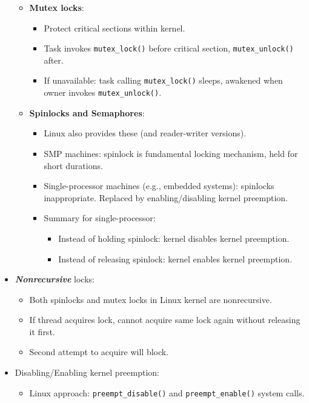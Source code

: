 \begin{itemize}
\begin{itemize}
        \item \textbf{Mutex locks}:
        \begin{itemize}
            \item Protect critical sections within kernel.
            \item Task invokes \texttt{mutex\_lock()} before critical section, \texttt{mutex\_unlock()} after.
            \item If unavailable: task calling \texttt{mutex\_lock()} sleeps, awakened when owner invokes \texttt{mutex\_unlock()}.
        \end{itemize}
        \item \textbf{Spinlocks and Semaphores}:
        \begin{itemize}
            \item Linux also provides these (and reader-writer versions).
            \item SMP machines: spinlock is fundamental locking mechanism, held for short durations.
            \item Single-processor machines (e.g., embedded systems): spinlocks inappropriate. Replaced by enabling/disabling kernel preemption.
            \item Summary for single-processor:
            \begin{itemize}
                \item Instead of holding spinlock: kernel disables kernel preemption.
                \item Instead of releasing spinlock: kernel enables kernel preemption.
            \end{itemize}
        \end{itemize}
    \end{itemize}
    \item \textbf{\textit{Nonrecursive}} locks:
    \begin{itemize}
        \item Both spinlocks and mutex locks in Linux kernel are nonrecursive.
        \item If thread acquires lock, cannot acquire same lock again without releasing it first.
        \item Second attempt to acquire will block.
    \end{itemize}
    \item Disabling/Enabling kernel preemption:
    \begin{itemize}
        \item Linux approach: \texttt{preempt\_disable()} and \texttt{preempt\_enable()} system calls.

\end{itemize}
\end{itemize}
